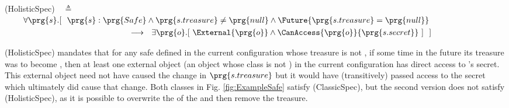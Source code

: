   \vspace{.01in}
(HolisticSpec)\ \  $\triangleq$\\ 
$\strut \hspace{.3in}   \forall \prg{s}. %
[\ \ \prg{s}:\prg{Safe} \wedge \prg{s.treasure}\neq\prg{null}   \wedge   \Future{\prg{s.treasure}=\prg{null}} $ \\ 
 $ \strut \hspace{5.3cm}     \longrightarrow \ \  \exists \prg{o}. [\  \External{\prg{o}} \wedge  \CanAccess{\prg{o}}{\prg{s.secret}}\ ]  \  \ ] \hfill $
\vspace{-.05in}

(HolisticSpec) mandates that for any safe  defined in the current configuration whose treasure is not , 
if some time in the future its treasure was to become ,
then at least one external object (\ie an object whose class is not ) in the current configuration
has direct access to 's secret. This external object need not have caused the change in $\prg{s.treasure}$ but it would 
 have (transitively) passed access to the secret which ultimately did cause that change.
%
Both classes in Fig. \ref{fig:ExampleSafe} satisfy (ClassicSpec), but the second version does not satisfy 
(HolisticSpec), as 
it is possible to overwrite the  of the  and then remove the treasure.
% 
%
\vspace{.02in}
%
% 

